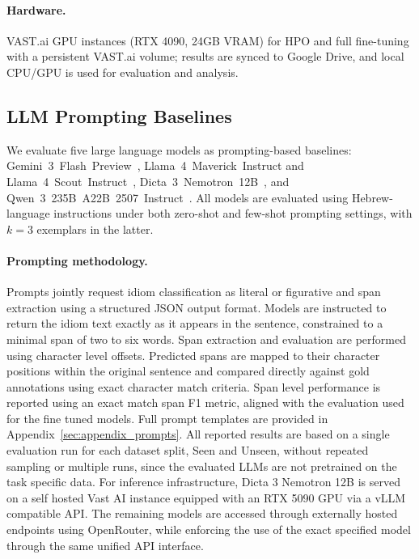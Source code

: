 \documentclass[11pt]{article}
\begin{document}
\paragraph{Hardware.}
VAST.ai GPU instances (RTX 4090, 24GB VRAM) for HPO and full fine-tuning with a persistent VAST.ai volume; results are synced to Google Drive, and local CPU/GPU is used for evaluation and analysis.

\subsection{LLM Prompting Baselines}
We evaluate five large language models as prompting-based baselines:
Gemini~3~Flash~Preview~\cite{google_gemini3_2024},
Llama~4~Maverick~Instruct and Llama~4~Scout~Instruct~\cite{MetaLlama4_2025},
Dicta~3~Nemotron~12B~\cite{Shmidman2025DictaLM3},
and Qwen~3~235B~A22B~2507~Instruct~\cite{qwen3_2025}.
All models are evaluated using Hebrew-language instructions under both zero-shot and few-shot prompting settings, with $k=3$ exemplars in the latter.



\paragraph{Prompting methodology.}
Prompts jointly request idiom classification as literal or figurative and span extraction using a structured JSON output format. Models are instructed to return the idiom text exactly as it appears in the sentence, constrained to a minimal span of two to six words. Span extraction and evaluation are performed using character level offsets. Predicted spans are mapped to their character positions within the original sentence and compared directly against gold annotations using exact character match criteria. Span level performance is reported using an exact match span F1 metric, aligned with the evaluation used for the fine tuned models. Full prompt templates are provided in Appendix~\ref{sec:appendix_prompts}. All reported results are based on a single evaluation run for each dataset split, Seen and Unseen, without repeated sampling or multiple runs, since the evaluated LLMs are not pretrained on the task specific data. For inference infrastructure, Dicta 3 Nemotron 12B is served on a self hosted Vast AI instance equipped with an RTX 5090 GPU via a vLLM compatible API. The remaining models are accessed through externally hosted endpoints using OpenRouter, while enforcing the use of the exact specified model through the same unified API interface.
\end{document}
